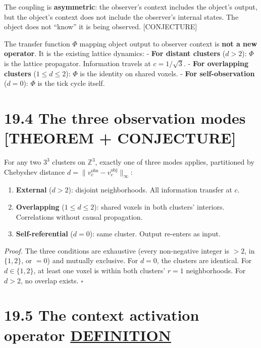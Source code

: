 \documentclass[
  11pt,
  letterpaper,
  twoside,
  openright]{book}
\providecommand{\tightlist}{%
  \setlength{\itemsep}{0pt}\setlength{\parskip}{0pt}}
\begin{document}
The coupling is \textbf{asymmetric}: the observer's context includes the
object's output, but the object's context does not include the
observer's internal states. The object does not ``know'' it is being
observed. {[}CONJECTURE{]}

The transfer function \(\Phi\) mapping object output to observer context
is \textbf{not a new operator}. It is the existing lattice dynamics: -
\textbf{For distant clusters} (\(d > 2\)): \(\Phi\) is the lattice
propagator. Information travels at \(c = 1/\sqrt{3}\). - \textbf{For
overlapping clusters} (\(1 \leq d \leq 2\)): \(\Phi\) is the identity on
shared voxels. - \textbf{For self-observation} (\(d = 0\)): \(\Phi\) is
the tick cycle itself.

\section{19.4 The three observation modes {[}THEOREM +
CONJECTURE{]}}\label{the-three-observation-modes-theorem-conjecture}

\begin{ftdtheorem}

For any two \(3^3\) clusters on \(\mathbb{Z}^3\), exactly one of three
modes applies, partitioned by Chebyshev distance
\(d = \|v_c^{\text{obs}} - v_c^{\text{obj}}\|_\infty\):

\begin{enumerate}
\def\labelenumi{\arabic{enumi}.}
\tightlist
\item
  \textbf{External} (\(d > 2\)): disjoint neighborhoods. All information
  transfer at \(c\).
\item
  \textbf{Overlapping} (\(1 \leq d \leq 2\)): shared voxels in both
  clusters' interiors. Correlations without causal propagation.
\item
  \textbf{Self-referential} (\(d = 0\)): same cluster. Output re-enters
  as input.
\end{enumerate}

\end{ftdtheorem}

\emph{Proof.} The three conditions are exhaustive (every non-negative
integer is \(> 2\), in \(\{1,2\}\), or \(= 0\)) and mutually exclusive.
For \(d = 0\), the clusters are identical. For \(d \in \{1,2\}\), at
least one voxel is within both clusters' \(r = 1\) neighborhoods. For
\(d > 2\), no overlap exists. \(\square\)

\section{\texorpdfstring{19.5 The context activation operator
\hyperref[definition]{DEFINITION}}{19.5 The context activation operator DEFINITION}}\label{the-context-activation-operator-definition}
\end{document}
